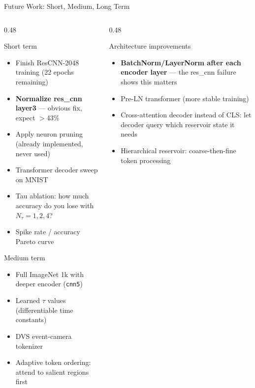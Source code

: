 \documentclass[aspectratio=169,11pt]{beamer}
\newcommand{\hl}[1]{{\color{highlight}\textbf{#1}}}
\begin{document}
\begin{frame}[shrink=12]{Future Work: Short, Medium, Long Term}
\begin{columns}[T]
\begin{column}{0.48\textwidth}
  \begin{block}{Short term}
    \begin{itemize}\scriptsize
      \item Finish ResCNN-2048 training (22 epochs remaining)
      \item \hl{Normalize res\_cnn layer3} — obvious fix, expect $>$43\%
      \item Apply neuron pruning (already implemented, never used)
      \item Transformer decoder sweep on MNIST
      \item Tau ablation: how much accuracy do you lose with $N_\tau{=}1,2,4$?
      \item Spike rate / accuracy Pareto curve
    \end{itemize}
  \end{block}
  \vspace{0.3em}
  \begin{block}{Medium term}
    \begin{itemize}\scriptsize
      \item Full ImageNet 1k with deeper encoder (\texttt{cnn5})
      \item Learned $\tau$ values (differentiable time constants)
      \item DVS event-camera tokenizer
      \item Adaptive token ordering: attend to salient regions first
    \end{itemize}
  \end{block}
\end{column}
\begin{column}{0.48\textwidth}
  \begin{exampleblock}{Architecture improvements}
    \begin{itemize}\small
      \item \hl{BatchNorm/LayerNorm after each encoder layer} — the res\_cnn failure shows this matters
      \item Pre-LN transformer (more stable training)
      \item Cross-attention decoder instead of CLS: let decoder query which reservoir state it needs
      \item Hierarchical reservoir: coarse-then-fine token processing

\end{itemize}
\end{exampleblock}
\end{column}
\end{columns}
\end{frame}
\end{document}
